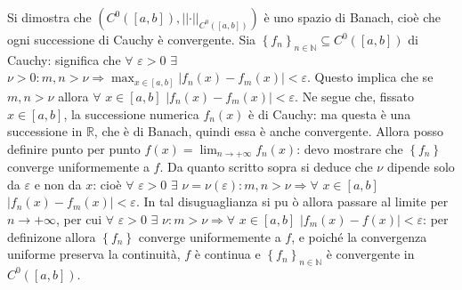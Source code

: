 \documentclass{article}
\begin{document}
Si dimostra che $\left( C^{0}\left( \left[ a,b\right] \right) ,\left\vert
\left\vert \cdot \right\vert \right\vert _{C^{0}\left( \left[ a,b\right]
\right) }\right) $ \`{e} uno spazio di Banach, cio\`{e} che ogni successione
di Cauchy \`{e} convergente. Sia $\left\{ f_{n}\right\} _{n\in 
\mathbb{N}
}\subseteq C^{0}\left( \left[ a,b\right] \right) $ di Cauchy: significa che $%
\forall $ $\varepsilon >0$ $\exists $ $\nu >0:m,n>\nu \Longrightarrow
\max_{x\in \left[ a,b\right] }\left\vert f_{n}\left( x\right) -f_{m}\left(
x\right) \right\vert <\varepsilon $. Questo implica che se $m,n>\nu $ allora 
$\forall $ $x\in \left[ a,b\right] $ $\left\vert f_{n}\left( x\right)
-f_{m}\left( x\right) \right\vert <\varepsilon $. Ne segue che, fissato $%
x\in \left[ a,b\right] $, la successione numerica $f_{n}\left( x\right) $ 
\`{e} di Cauchy: ma questa \`{e} una successione in $%
\mathbb{R}
$, che \`{e} di Banach, quindi essa \`{e} anche convergente. Allora posso
definire punto per punto $f\left( x\right) =\lim_{n\rightarrow +\infty
}f_{n}\left( x\right) $: devo mostrare che $\left\{ f_{n}\right\} $ converge
uniformemente a $f$. Da quanto scritto sopra si deduce che $\nu $ dipende
solo da $\varepsilon $ e non da $x$: cio\`{e} $\forall $ $\varepsilon >0$ $%
\exists $ $\nu =\nu \left( \varepsilon \right) :m,n>\nu \Longrightarrow
\forall $ $x\in \left[ a,b\right] $ $\left\vert f_{n}\left( x\right)
-f_{m}\left( x\right) \right\vert <\varepsilon $. In tal disuguaglianza si pu%
\`{o} allora passare al limite per $n\rightarrow +\infty $, per cui $\forall 
$ $\varepsilon >0$ $\exists $ $\nu :m>\nu \Longrightarrow \forall $ $x\in %
\left[ a,b\right] $ $\left\vert f_{m}\left( x\right) -f\left( x\right)
\right\vert <\varepsilon $: per definizone allora $\left\{ f_{n}\right\} $
converge uniformemente a $f$, e poich\'{e} la convergenza uniforme preserva
la continuit\`{a}, $f$ \`{e} continua e $\left\{ f_{n}\right\} _{n\in 
\mathbb{N}
}$ \`{e} convergente in $C^{0}\left( \left[ a,b\right] \right) $.
\end{document}
